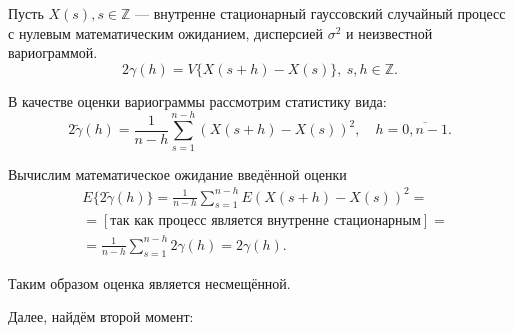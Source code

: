 \documentclass[a4paper]{article}
\begin{document}
Пусть $ X(s), s \in \mathbb{Z} $ --- внутренне стационарный гауссовский случайный процесс с нулевым математическим ожиданием, дисперсией $ \sigma^2 $ и неизвестной вариограммой.
\begin{equation*}
	2 \gamma(h) = V \{ X(s+h) - X(s) \}, ~ s,h \in \mathbb{Z}.
\end{equation*}

В качестве оценки вариограммы рассмотрим статистику вида:
\begin{equation}
	\label{eq:var_est}
	2 \tilde{\gamma}(h) = \frac{1}{n-h} \sum_{s=1}^{n-h}(X(s+h) - X(s))^2, \quad h = \overline{0, n-1}.
\end{equation}

Вычислим математическое ожидание введённой оценки %
\begin{eqnarray*}
	& E \{ 2 \tilde{\gamma}(h) \} = \frac{1}{n-h} \sum_{s=1}^{n-h} E(X(s+h) - X(s))^2 = \\
	& = [\text{так как процесс является внутренне стационарным}] = \\
	& = \frac{1}{n-h} \sum_{s=1}^{n-h} 2 \gamma(h) = 2 \gamma(h).
\end{eqnarray*}

Таким образом оценка является несмещённой.

Далее, найдём второй момент:
\end{document}
